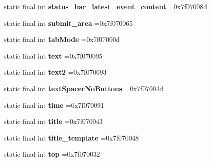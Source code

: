 \begin{DoxyCompactItemize}
static final int {\bfseries status\+\_\+bar\+\_\+latest\+\_\+event\+\_\+content} =0x7f07008d
\item 
\mbox{\label{classproject4_1_1xaria_1_1R_1_1id_ab16794e3e3b81489339b522cd1ec1ec5}} 
static final int {\bfseries submit\+\_\+area} =0x7f070065
\item 
\mbox{\label{classproject4_1_1xaria_1_1R_1_1id_af135c7380bee024f0285d16dea3e1058}} 
static final int {\bfseries tab\+Mode} =0x7f07000d
\item 
\mbox{\label{classproject4_1_1xaria_1_1R_1_1id_af4eaa200578efb58cadc9cdc092957e7}} 
static final int {\bfseries text} =0x7f070095
\item 
\mbox{\label{classproject4_1_1xaria_1_1R_1_1id_ac119508307090b51313cea8fa5f7cd21}} 
static final int {\bfseries text2} =0x7f070093
\item 
\mbox{\label{classproject4_1_1xaria_1_1R_1_1id_a2a8fb8bba00b3443de9b034cefd1ae45}} 
static final int {\bfseries text\+Spacer\+No\+Buttons} =0x7f07004d
\item 
\mbox{\label{classproject4_1_1xaria_1_1R_1_1id_a248428dbaa0fcad214265f1adc02d57d}} 
static final int {\bfseries time} =0x7f070091
\item 
\mbox{\label{classproject4_1_1xaria_1_1R_1_1id_afcf682788d0df074da206b9b0e2b9ab5}} 
static final int {\bfseries title} =0x7f070043
\item 
\mbox{\label{classproject4_1_1xaria_1_1R_1_1id_aea2ac0c5caa26b1422a5d27fff56e951}} 
static final int {\bfseries title\+\_\+template} =0x7f070048
\item 
\mbox{\label{classproject4_1_1xaria_1_1R_1_1id_a73c737933f23ec4a6adf49c832799fd8}} 
static final int {\bfseries top} =0x7f070032
\item 
\mbox{\label{classproject4_1_1xaria_1_1R_1_1id_a61b20d8c6ca9a89dd9ffa50b0a301b91}} 

\end{DoxyCompactItemize}
